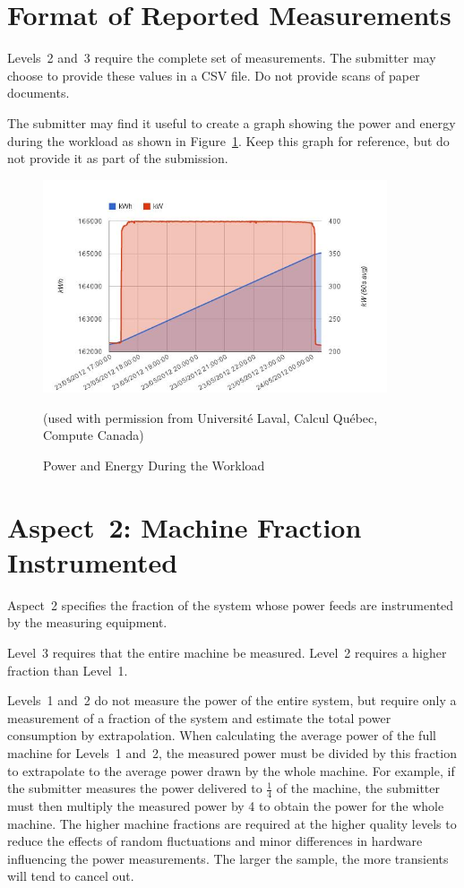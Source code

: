 \section{Format of Reported Measurements}
\label{sec:FoRM}

Levels~2 and~3 require the complete set of measurements.
The submitter may choose to provide these values in a CSV file.
Do not provide scans of paper documents.

The submitter may find it useful to create a graph showing the power and energy during the workload as shown in Figure~\ref{fig:powengwl}.
Keep this graph for reference, but do not provide it as part of the submission.


\begin{figure}
\centering
\includegraphics[width=4in]{fig3-6}
\caption{Power and Energy During the Workload}
(used with permission from Universit\'{e} Laval, Calcul Qu\'{e}bec, Compute Canada)
\label{fig:powengwl}
\end{figure}

\section{Aspect~2: Machine Fraction Instrumented}
\label{sec:A2MFI}

Aspect~2 specifies the fraction of the system whose power feeds are instrumented by the measuring equipment.

Level~3 requires that the entire machine be measured.
Level~2 requires a higher fraction than Level~1.

Levels~1 and~2 do not measure the power of the entire system, but require only a measurement of a fraction of the system and estimate the total power consumption by extrapolation.
When calculating the average power of the full machine for Levels~1 and~2, the measured power must be divided by this fraction to extrapolate to the average power drawn by the whole machine.
For example, if the submitter measures the power delivered to $\frac{1}{4} $ of the machine, the submitter must then multiply the measured power by \num{4} to obtain the power for the whole machine.
The higher machine fractions are required at the higher quality levels to reduce the effects of random fluctuations and minor differences in hardware influencing the power measurements.
The larger the sample, the more transients will tend to cancel out.

